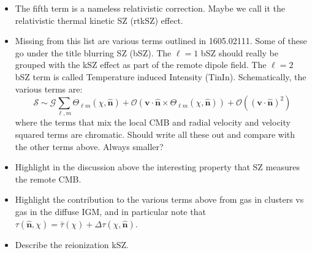 \documentclass[aps,nofootinbib,groupedaddress]{revtex4}
\begin{document}
\begin{itemize}
\item The fifth term is a nameless relativistic correction. Maybe we call it the relativistic thermal kinetic SZ (rtkSZ) effect.
\item Missing from this list are various terms outlined in 1605.02111. Some of these go under the title blurring SZ (bSZ). The $\ell = 1$ bSZ should really be grouped with the kSZ effect as part of the remote dipole field. The $\ell = 2$ bSZ term is called Temperature induced Intensity (TinIn). Schematically, the various terms are:
\begin{equation}
\mathcal{S} \sim \mathcal{G} \sum_{\ell,m} \Theta_{\ell m} (\chi, \mathbf{\hat{n}}) + \mathcal{O}( \mathbf{v}\cdot\mathbf{\hat{n}} \times \Theta_{\ell m} (\chi, \mathbf{\hat{n}})) + \mathcal{O}( (\mathbf{v}\cdot\mathbf{\hat{n}})^2 )
\end{equation}
where the terms that mix the local CMB and radial velocity and velocity squared terms are chromatic. Should write all these out and compare with the other terms above. Always smaller?
\item Highlight in the discussion above the interesting property that SZ measures the remote CMB.
\item Highlight the contribution to the various terms above from gas in clusters vs gas in the diffuse IGM, and in particular note that $\tau (\mathbf{\hat{n}}, \chi) = \bar{\tau} (\chi) + \Delta\tau (\chi, \mathbf{\hat{n}}) $. 
\item Describe the reionization kSZ.
\end{itemize}
\end{document}
